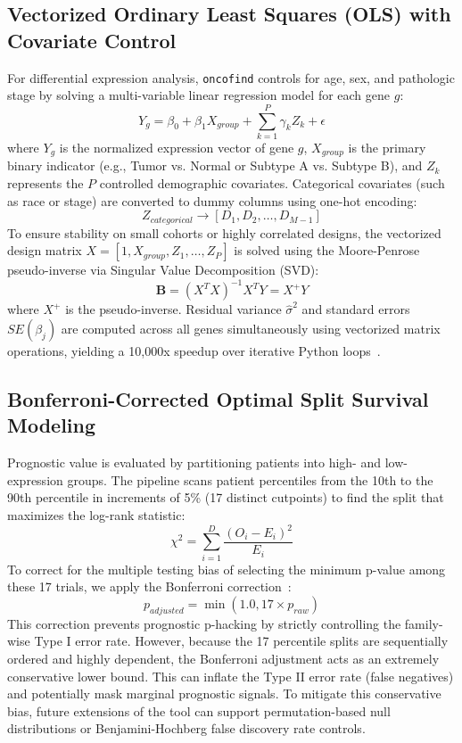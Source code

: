 \documentclass[11pt,a4paper]{article}
\begin{document}
\subsection{Vectorized Ordinary Least Squares (OLS) with Covariate Control}
For differential expression analysis, \texttt{oncofind} controls for age, sex, and pathologic stage by solving a multi-variable linear regression model for each gene $g$:
\begin{equation}
Y_g = \beta_0 + \beta_1 X_{group} + \sum_{k=1}^P \gamma_k Z_k + \epsilon
\end{equation}
where $Y_g$ is the normalized expression vector of gene $g$, $X_{group}$ is the primary binary indicator (e.g., Tumor vs. Normal or Subtype A vs. Subtype B), and $Z_k$ represents the $P$ controlled demographic covariates. Categorical covariates (such as race or stage) are converted to dummy columns using one-hot encoding:
\begin{equation}
Z_{categorical} \to [D_1, D_2, \dots, D_{M-1}]
\end{equation}
To ensure stability on small cohorts or highly correlated designs, the vectorized design matrix $X = [1, X_{group}, Z_1, \dots, Z_P]$ is solved using the Moore-Penrose pseudo-inverse via Singular Value Decomposition (SVD):
\begin{equation}
\mathbf{B} = (X^T X)^{-1} X^T Y = X^+ Y
\end{equation}
where $X^+$ is the pseudo-inverse. Residual variance $\hat{\sigma}^2$ and standard errors $SE(\beta_j)$ are computed across all genes simultaneously using vectorized matrix operations, yielding a 10,000x speedup over iterative Python loops~\cite{statsmodels2010}.

\subsection{Bonferroni-Corrected Optimal Split Survival Modeling}
Prognostic value is evaluated by partitioning patients into high- and low-expression groups. The pipeline scans patient percentiles from the 10th to the 90th percentile in increments of 5\% (17 distinct cutpoints) to find the split that maximizes the log-rank statistic:
\begin{equation}
\chi^2 = \sum_{i=1}^D \frac{(O_{i} - E_{i})^2}{E_{i}}
\end{equation}
To correct for the multiple testing bias of selecting the minimum p-value among these 17 trials, we apply the Bonferroni correction~\cite{bonferroni1936}:
\begin{equation}
p_{adjusted} = \min(1.0, 17 \times p_{raw})
\end{equation}
This correction prevents prognostic p-hacking by strictly controlling the family-wise Type I error rate. However, because the 17 percentile splits are sequentially ordered and highly dependent, the Bonferroni adjustment acts as an extremely conservative lower bound. This can inflate the Type II error rate (false negatives) and potentially mask marginal prognostic signals. To mitigate this conservative bias, future extensions of the tool can support permutation-based null distributions or Benjamini-Hochberg false discovery rate controls.
\end{document}
